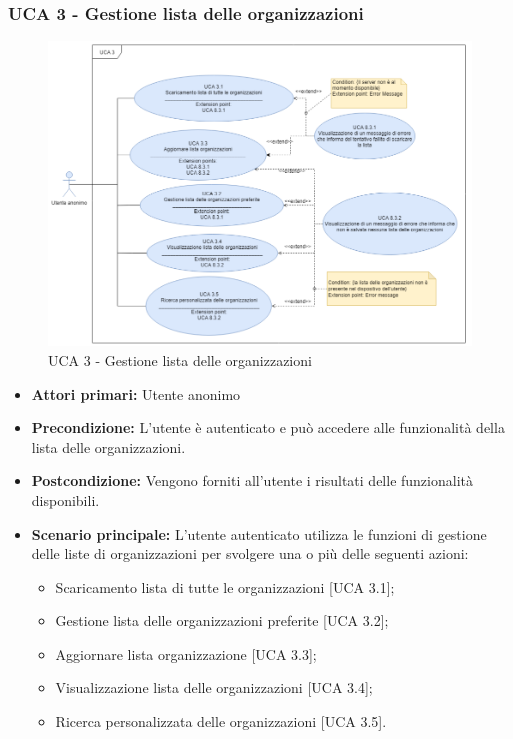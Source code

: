 \subsubsection{UCA 3 - Gestione lista delle organizzazioni}%
\begin{figure}[h]
	\centering
	\includegraphics[scale=0.5, center]{sezioni/UseCase/Immagini/UCA3.png}
	\caption{UCA 3 - Gestione lista delle organizzazioni}
\end{figure} 

\begin{itemize}
\item \textbf{Attori primari:} Utente anonimo
\item \textbf{Precondizione:} L'utente è autenticato e può accedere alle funzionalità della lista delle organizzazioni.
\item \textbf{Postcondizione:} Vengono forniti all'utente i risultati delle funzionalità disponibili.
\item \textbf{Scenario principale:} L'utente autenticato utilizza le funzioni di gestione delle liste di organizzazioni per svolgere una o più delle seguenti azioni:
	\begin{itemize}
		\item Scaricamento lista di tutte le organizzazioni [UCA 3.1];
		\item Gestione lista delle organizzazioni preferite [UCA 3.2];
		\item Aggiornare lista organizzazione [UCA 3.3];
		\item Visualizzazione lista delle organizzazioni [UCA 3.4];
		\item Ricerca personalizzata delle organizzazioni [UCA 3.5].
	\end{itemize}
\end{itemize}

